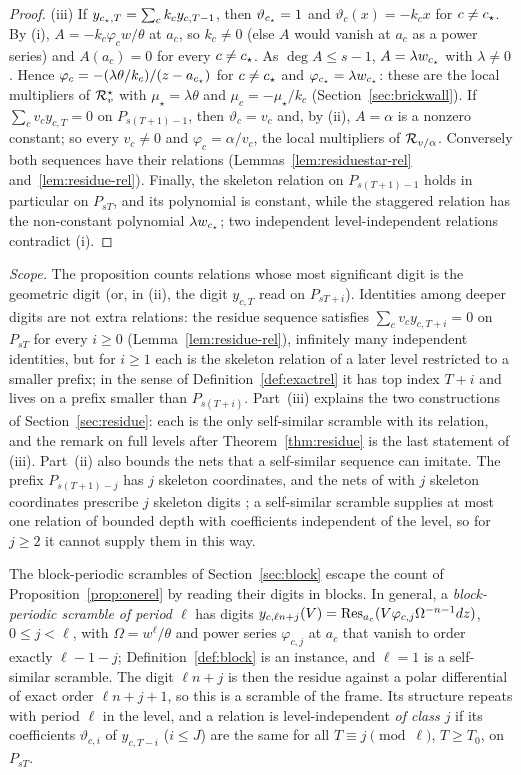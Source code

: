 \begin{proof}
(iii) If $y_{c_{\star},T}=\sum_ck_cy_{c,T-1}$, then $\vartheta_{c_{\star}}=1$ and $\vartheta_c(x)=-k_cx$ for $c\ne c_{\star}$. By (i), $A=-k_c\varphi_cw/\theta$ at $a_c$, so $k_c\ne0$ (else $A$ would vanish at $a_c$ as a power series) and $A(a_c)=0$ for every $c\ne c_{\star}$. As $\deg A\le s-1$, $A=\lambda w_{c_{\star}}$ with $\lambda\ne0$. Hence $\varphi_c=-(\lambda\theta/k_c)/(z-a_{c_{\star}})$ for $c\ne c_{\star}$ and $\varphi_{c_{\star}}=\lambda w_{c_{\star}}$: these are the local multipliers of $\mathcal{R}^{\star}_v$ with $\mu_\star=\lambda\theta$ and $\mu_c=-\mu_\star/k_c$ (Section~\ref{sec:brickwall}). If $\sum_cv_cy_{c,T}=0$ on $P_{s(T+1)-1}$, then $\vartheta_c=v_c$ and, by (ii), $A=\alpha$ is a nonzero constant; so every $v_c\ne0$ and $\varphi_c=\alpha/v_c$, the local multipliers of $\mathcal{R}_{v/\alpha}$. Conversely both sequences have their relations (Lemmas~\ref{lem:residuestar-rel} and~\ref{lem:residue-rel}). Finally, the skeleton relation on $P_{s(T+1)-1}$ holds in particular on $P_{sT}$, and its polynomial is constant, while the staggered relation has the non-constant polynomial $\lambda w_{c_{\star}}$; two independent level-independent relations contradict (i).
\end{proof}

\emph{Scope.} The proposition counts relations whose most significant digit is the geometric digit (or, in (ii), the digit $y_{c,T}$ read on $P_{sT+i}$). Identities among deeper digits are not extra relations: the residue sequence satisfies $\sum_cv_cy_{c,T+i}=0$ on $P_{sT}$ for every $i\ge0$ (Lemma~\ref{lem:residue-rel}), infinitely many independent identities, but for $i\ge1$ each is the skeleton relation of a later level restricted to a smaller prefix; in the sense of Definition~\ref{def:exactrel} it has top index $T+i$ and lives on a prefix smaller than $P_{s(T+i)}$. Part~(iii) explains the two constructions of Section~\ref{sec:residue}: each is the only self-similar scramble with its relation, and the remark on full levels after Theorem~\ref{thm:residue} is the last statement of (iii). Part~(ii) also bounds the nets that a self-similar sequence can imitate. The prefix $P_{s(T+1)-j}$ has $j$ skeleton coordinates, and the nets of \cite{Gru26geo} with $j$ skeleton coordinates prescribe $j$ skeleton digits%
; a self-similar scramble supplies at most one relation of bounded depth with coefficients independent of the level, so for $j\ge2$ it cannot supply them in this way.

The block-periodic scrambles of Section~\ref{sec:block} escape the count of Proposition~\ref{prop:onerel} by reading their digits in blocks. In general, a \emph{block-periodic scramble of period $\ell$} has digits $y_{c,\ell n+j}(V)=\operatorname{Res}_{a_c}(V\varphi_{c,j}\Omega^{-n-1}dz)$, $0\le j<\ell$, with $\Omega=w^\ell/\theta$ and power series $\varphi_{c,j}$ at $a_c$ that vanish to order exactly $\ell-1-j$; Definition~\ref{def:block} is an instance, and $\ell=1$ is a self-similar scramble. The digit $\ell n+j$ is then the residue against a polar differential of exact order $\ell n+j+1$, so this is a scramble of the frame. Its structure repeats with period $\ell$ in the level, and a relation is level-independent \emph{of class $j$} if its coefficients $\vartheta_{c,i}$ of $y_{c,T-i}$ ($i\le J$) are the same for all $T\equiv j\pmod\ell$, $T\ge T_0$, on $P_{sT}$.


